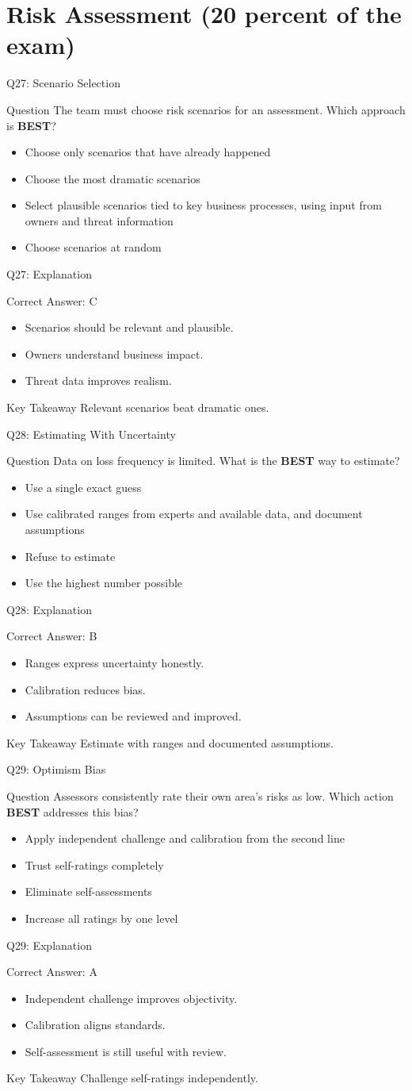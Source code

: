 \documentclass[aspectratio=169]{beamer}
\newcommand{\hq}[7]{%
	\begin{frame}{Q#1: #2}
		\begin{block}{Question}
			#3
		\end{block}
		\begin{itemize}
			#4
		\end{itemize}
	\end{frame}
	\begin{frame}{Q#1: Explanation}
		\begin{block}{Correct Answer: #5}
			\begin{itemize}
				#6
			\end{itemize}
		\end{block}
		\begin{alertblock}{Key Takeaway}
			#7
		\end{alertblock}
	\end{frame}
}
\begin{document}
	\section{Risk Assessment (20 percent of the exam)}
	
	\hq{27}{Scenario Selection}
	{The team must choose risk scenarios for an assessment. Which approach is \textbf{BEST}?}
	{\item[\textbf{(A)}] Choose only scenarios that have already happened
		\item[\textbf{(B)}] Choose the most dramatic scenarios
		\item[\textbf{(C)}] Select plausible scenarios tied to key business processes, using input from owners and threat information
		\item[\textbf{(D)}] Choose scenarios at random}
	{C}
	{\item Scenarios should be relevant and plausible.
		\item Owners understand business impact.
		\item Threat data improves realism.}
	{Relevant scenarios beat dramatic ones.}
	
	\hq{28}{Estimating With Uncertainty}
	{Data on loss frequency is limited. What is the \textbf{BEST} way to estimate?}
	{\item[\textbf{(A)}] Use a single exact guess
		\item[\textbf{(B)}] Use calibrated ranges from experts and available data, and document assumptions
		\item[\textbf{(C)}] Refuse to estimate
		\item[\textbf{(D)}] Use the highest number possible}
	{B}
	{\item Ranges express uncertainty honestly.
		\item Calibration reduces bias.
		\item Assumptions can be reviewed and improved.}
	{Estimate with ranges and documented assumptions.}
	
	\hq{29}{Optimism Bias}
	{Assessors consistently rate their own area's risks as low. Which action \textbf{BEST} addresses this bias?}
	{\item[\textbf{(A)}] Apply independent challenge and calibration from the second line
		\item[\textbf{(B)}] Trust self-ratings completely
		\item[\textbf{(C)}] Eliminate self-assessments
		\item[\textbf{(D)}] Increase all ratings by one level}
	{A}
	{\item Independent challenge improves objectivity.
		\item Calibration aligns standards.
		\item Self-assessment is still useful with review.}
	{Challenge self-ratings independently.}
	
\end{document}
